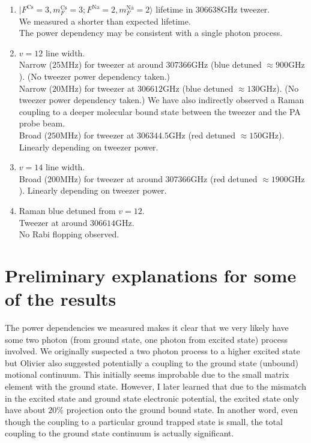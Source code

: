 \documentclass[10pt,fleqn]{article}
\begin{document}
\begin{enumerate}
\item $|F^{\mathrm{Cs}}\!=\!3, m_{F}^{\mathrm{Cs}}\!=\!3; F^{\mathrm{Na}}\!=\!2, m_{F}^{\mathrm{Na}}\!=\!2\rangle$ lifetime
  in $306638 \mathrm{GHz}$ tweezer.\\
  We measured a shorter than expected lifetime.\\
  The power dependency may be consistent with a single photon process.
\item $v=12$ line width.\\
  Narrow ($25 \mathrm{MHz}$) for tweezer at around $307366 \mathrm{GHz}$
  (blue detuned $\approx 900\mathrm{GHz}$). (No tweezer power dependency taken.)\\
  Narrow ($20 \mathrm{MHz}$) for tweezer at $306612 \mathrm{GHz}$
  (blue detuned $\approx 130\mathrm{GHz}$). (No tweezer power dependency taken.)
  We have also indirectly observed a Raman coupling to a deeper molecular bound state
  between the tweezer and the PA probe beam.\\
  Broad ($250 \mathrm{MHz}$) for tweezer at $306344.5 \mathrm{GHz}$
  (red detuned $\approx 150\mathrm{GHz}$). Linearly depending on tweezer power.\\
\item $v=14$ line width.\\
  Broad ($200 \mathrm{MHz}$) for tweezer at around $307366 \mathrm{GHz}$
  (red detuned $\approx 1900\mathrm{GHz}$). Linearly depending on tweezer power.\\
\item Raman blue detuned from $v=12$.\\
  Tweezer at around $306614 \mathrm{GHz}$.\\
  No Rabi flopping observed.
\end{enumerate}

\section{Preliminary explanations for some of the results}
The power dependencies we measured makes it clear that we very likely
have some two photon (from ground state, one photon from excited state) process involved.
We originally suspected a two photon process to a higher excited state but Olivier also
suggested potentially a coupling to the ground state (unbound) motional continuum.
This initially seems improbable due to the small matrix element with the ground state.
However, I later learned that due to the mismatch in the excited state and ground state
electronic potential, the excited state only have about $20\%$ projection onto the ground
bound state. In another word, even though the coupling to a particular ground trapped
state is small, the total coupling to the ground state continuum is actually significant.\\
\end{document}

